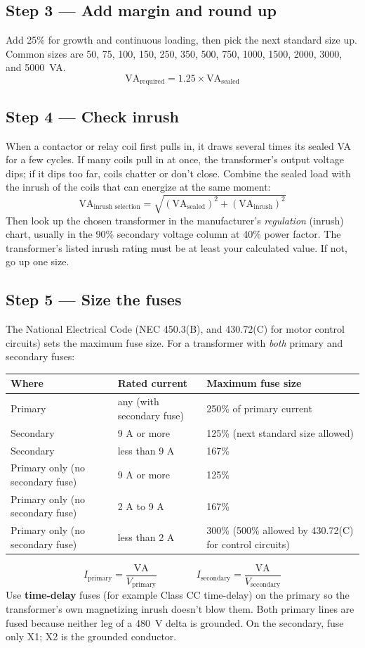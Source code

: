 \subsection*{Step 3 --- Add margin and round up}
Add 25\% for growth and continuous loading, then pick the next standard size up. Common sizes are 50, 75, 100, 150, 250, 350, 500, 750, 1000, 1500, 2000, 3000, and 5000~VA.
\[
  \text{VA}_{\text{required}} = 1.25 \times \text{VA}_{\text{sealed}}
\]

\subsection*{Step 4 --- Check inrush}
When a contactor or relay coil first pulls in, it draws several times its sealed VA for a few cycles. If many coils pull in at once, the transformer's output voltage dips; if it dips too far, coils chatter or don't close. Combine the sealed load with the inrush of the coils that can energize at the same moment:
\[
  \text{VA}_{\text{inrush selection}} = \sqrt{\left(\text{VA}_{\text{sealed}}\right)^2 + \left(\text{VA}_{\text{inrush}}\right)^2}
\]
Then look up the chosen transformer in the manufacturer's \emph{regulation} (inrush) chart, usually in the 90\% secondary voltage column at 40\% power factor. The transformer's listed inrush rating must be at least your calculated value. If not, go up one size.

\subsection*{Step 5 --- Size the fuses}
The National Electrical Code (NEC 450.3(B), and 430.72(C) for motor control circuits) sets the maximum fuse size. For a transformer with \emph{both} primary and secondary fuses:
\begin{center}
\small
\begin{tabular}{@{}lll@{}}
\toprule
\rowcolor{tblhead}\textbf{Where} & \textbf{Rated current} & \textbf{Maximum fuse size} \\ \midrule
Primary & any (with secondary fuse) & 250\% of primary current \\
Secondary & 9 A or more & 125\% (next standard size allowed) \\
Secondary & less than 9 A & 167\% \\
Primary only (no secondary fuse) & 9 A or more & 125\% \\
Primary only (no secondary fuse) & 2 A to 9 A & 167\% \\
Primary only (no secondary fuse) & less than 2 A & 300\% (500\% allowed by 430.72(C) for control circuits) \\
\bottomrule
\end{tabular}
\end{center}
\[
  I_{\text{primary}} = \frac{\text{VA}}{V_{\text{primary}}}
  \qquad\qquad
  I_{\text{secondary}} = \frac{\text{VA}}{V_{\text{secondary}}}
\]
Use \textbf{time-delay} fuses (for example Class CC time-delay) on the primary so the transformer's own magnetizing inrush doesn't blow them. Both primary lines are fused because neither leg of a 480~V delta is grounded. On the secondary, fuse only X1; X2 is the grounded conductor.


